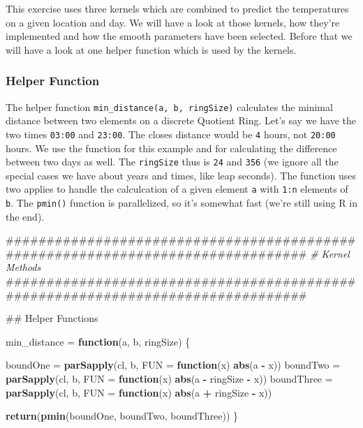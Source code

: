 \documentclass[]{article}
\newenvironment{Shaded}{\begin{snugshade}}{\end{snugshade}}
\newcommand{\KeywordTok}[1]{\textcolor[rgb]{0.13,0.29,0.53}{\textbf{#1}}}
\newcommand{\DataTypeTok}[1]{\textcolor[rgb]{0.13,0.29,0.53}{#1}}
\newcommand{\StringTok}[1]{\textcolor[rgb]{0.31,0.60,0.02}{#1}}
\newcommand{\CommentTok}[1]{\textcolor[rgb]{0.56,0.35,0.01}{\textit{#1}}}
\newcommand{\ControlFlowTok}[1]{\textcolor[rgb]{0.13,0.29,0.53}{\textbf{#1}}}
\newcommand{\OperatorTok}[1]{\textcolor[rgb]{0.81,0.36,0.00}{\textbf{#1}}}
\newcommand{\NormalTok}[1]{#1}
\begin{document}
This exercise uses three kernels which are combined to predict the
temperatures on a given location and day. We will have a look at those
kernels, how they're implemented and how the smooth parameters have been
selected. Before that we will have a look at one helper function which
is used by the kernels.

\subsubsection{Helper Function}\label{helper-function}

The helper function \texttt{min\_distance(a,\ b,\ ringSize)} calculates
the minimal distance between two elements on a discrete Quotient Ring.
Let's say we have the two times \texttt{03:00} and \texttt{23:00}. The
closes distance would be \texttt{4} hours, not \texttt{20:00} hours. We
use the function for this example and for calculating the difference
between two days as well. The \texttt{ringSize} thus is \texttt{24} and
\texttt{356} (we ignore all the special cases we have about years and
times, like leap seconds). The function uses two applies to handle the
calculcation of a given element \texttt{a} with \texttt{1:n} elements of
\texttt{b}. The \texttt{pmin()} function is parallelized, so it's
somewhat fast (we're still using R in the end).

\begin{Shaded}
\begin{Highlighting}[]
\NormalTok{################################################################################}
\CommentTok{# Kernel Methods}
\NormalTok{################################################################################}

\NormalTok{## Helper Functions}

\NormalTok{min_distance =}\StringTok{ }\ControlFlowTok{function}\NormalTok{(a, b, ringSize) \{}
  
\NormalTok{  boundOne =}\StringTok{ }\KeywordTok{parSapply}\NormalTok{(cl, b, }\DataTypeTok{FUN =} \ControlFlowTok{function}\NormalTok{(x) }\KeywordTok{abs}\NormalTok{(a }\OperatorTok{-}\StringTok{ }\NormalTok{x))}
\NormalTok{  boundTwo =}\StringTok{ }\KeywordTok{parSapply}\NormalTok{(cl, b, }\DataTypeTok{FUN =} \ControlFlowTok{function}\NormalTok{(x) }\KeywordTok{abs}\NormalTok{(a }\OperatorTok{-}\StringTok{ }\NormalTok{ringSize }\OperatorTok{-}\StringTok{ }\NormalTok{x))}
\NormalTok{  boundThree =}\StringTok{ }\KeywordTok{parSapply}\NormalTok{(cl, b, }\DataTypeTok{FUN =} \ControlFlowTok{function}\NormalTok{(x) }\KeywordTok{abs}\NormalTok{(a }\OperatorTok{+}\StringTok{ }\NormalTok{ringSize }\OperatorTok{-}\StringTok{ }\NormalTok{x))}
    
  \KeywordTok{return}\NormalTok{(}\KeywordTok{pmin}\NormalTok{(boundOne, boundTwo, boundThree))}
\NormalTok{\}}
\end{Highlighting}
\end{Shaded}
\end{document}
